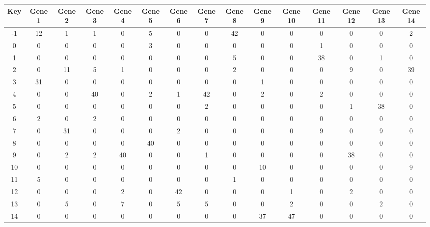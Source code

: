 \begin{tabular}{|c|c|c|c|c|c|c|c|c|c|c|c|c|c|c|}
\hline
Key & Gene 1 & Gene 2 & Gene 3 & Gene 4 & Gene 5 & Gene 6 & Gene 7 & Gene 8 & Gene 9 & Gene 10 & Gene 11 & Gene 12 & Gene 13 & Gene 14 \\
\hline
-1 & 12 & 1 & 1 & 0 & 5 & 0 & 0 & 42 & 0 & 0 & 0 & 0 & 0 & 2 \\
0 & 0 & 0 & 0 & 0 & 3 & 0 & 0 & 0 & 0 & 0 & 1 & 0 & 0 & 0 \\
1 & 0 & 0 & 0 & 0 & 0 & 0 & 0 & 5 & 0 & 0 & 38 & 0 & 1 & 0 \\
2 & 0 & 11 & 5 & 1 & 0 & 0 & 0 & 2 & 0 & 0 & 0 & 9 & 0 & 39 \\
3 & 31 & 0 & 0 & 0 & 0 & 0 & 0 & 0 & 1 & 0 & 0 & 0 & 0 & 0 \\
4 & 0 & 0 & 40 & 0 & 2 & 1 & 42 & 0 & 2 & 0 & 2 & 0 & 0 & 0 \\
5 & 0 & 0 & 0 & 0 & 0 & 0 & 2 & 0 & 0 & 0 & 0 & 1 & 38 & 0 \\
6 & 2 & 0 & 2 & 0 & 0 & 0 & 0 & 0 & 0 & 0 & 0 & 0 & 0 & 0 \\
7 & 0 & 31 & 0 & 0 & 0 & 2 & 0 & 0 & 0 & 0 & 9 & 0 & 9 & 0 \\
8 & 0 & 0 & 0 & 0 & 40 & 0 & 0 & 0 & 0 & 0 & 0 & 0 & 0 & 0 \\
9 & 0 & 2 & 2 & 40 & 0 & 0 & 1 & 0 & 0 & 0 & 0 & 38 & 0 & 0 \\
10 & 0 & 0 & 0 & 0 & 0 & 0 & 0 & 0 & 10 & 0 & 0 & 0 & 0 & 9 \\
11 & 5 & 0 & 0 & 0 & 0 & 0 & 0 & 1 & 0 & 0 & 0 & 0 & 0 & 0 \\
12 & 0 & 0 & 0 & 2 & 0 & 42 & 0 & 0 & 0 & 1 & 0 & 2 & 0 & 0 \\
13 & 0 & 5 & 0 & 7 & 0 & 5 & 5 & 0 & 0 & 2 & 0 & 0 & 2 & 0 \\
14 & 0 & 0 & 0 & 0 & 0 & 0 & 0 & 0 & 37 & 47 & 0 & 0 & 0 & 0 \\
\hline
\end{tabular}